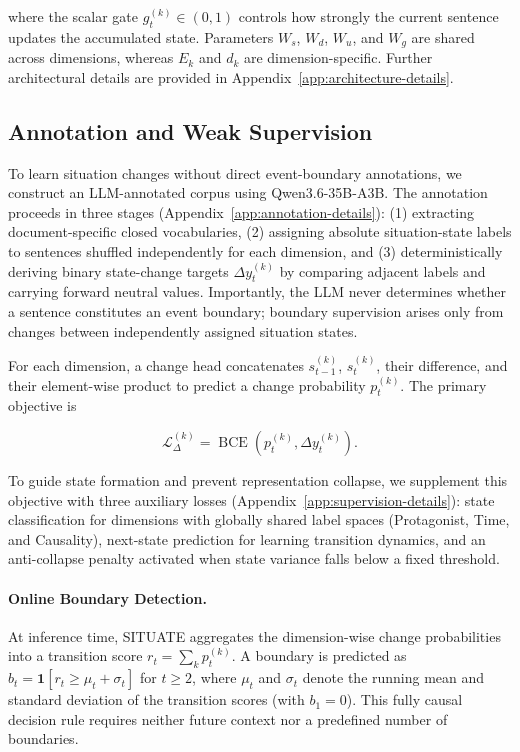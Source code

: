 \documentclass[11pt]{article}
\begin{document}
where the scalar gate $g_t^{(k)} \in (0,1)$ controls how strongly the current sentence updates the accumulated state. Parameters $W_s$, $W_d$, $W_u$, and $W_g$ are shared across dimensions, whereas $E_k$ and $d_k$ are dimension-specific. Further architectural details are provided in Appendix~\ref{app:architecture-details}.

\subsection{Annotation and Weak Supervision}
\label{sec:situation-state-supervision}

To learn situation changes without direct event-boundary annotations, we construct an LLM-annotated corpus using Qwen3.6-35B-A3B. The annotation proceeds in three stages (Appendix~\ref{app:annotation-details}): (1) extracting document-specific closed vocabularies, (2) assigning absolute situation-state labels to sentences shuffled independently for each dimension, and (3) deterministically deriving binary state-change targets $\Delta y_t^{(k)}$ by comparing adjacent labels and carrying forward neutral values. Importantly, the LLM never determines whether a sentence constitutes an event boundary; boundary supervision arises only from changes between independently assigned situation states.

For each dimension, a change head concatenates $s_{t-1}^{(k)}$, $s_t^{(k)}$, their difference, and their element-wise product to predict a change probability $p_t^{(k)}$. The primary objective is

\begin{equation}
\mathcal{L}_{\Delta}^{(k)} = \operatorname{BCE}\left(p_t^{(k)}, \Delta y_t^{(k)}\right).
\label{eq:state-change-main}
\end{equation}

To guide state formation and prevent representation collapse, we supplement this objective with three auxiliary losses (Appendix~\ref{app:supervision-details}): state classification for dimensions with globally shared label spaces (Protagonist, Time, and Causality), next-state prediction for learning transition dynamics, and an anti-collapse penalty activated when state variance falls below a fixed threshold.

\paragraph{Online Boundary Detection.}
At inference time, SITUATE aggregates the dimension-wise change probabilities into a transition score $r_t = \sum_{k} p_t^{(k)}$. A boundary is predicted as $b_t=\mathbf{1}[r_t \geq \mu_t+\sigma_t]$ for $t\geq2$, where $\mu_t$ and $\sigma_t$ denote the running mean and standard deviation of the transition scores (with $b_1=0$). This fully causal decision rule requires neither future context nor a predefined number of boundaries.
\end{document}
